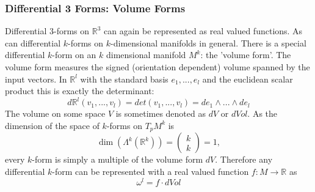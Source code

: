 \subsubsection*{Differential 3 Forms: Volume Forms}
Differential $3$-forms on $\mathbb R^3$ can again be represented as real valued functions. As can differential $k$-forms on $k$-dimensional manifolds in general.
There is a special differential $k$-form on an $k$ dimensional manifold $M^k$: the 'volume form'. The volume form measures the signed (orientation dependent) volume spanned by the input vectors. In $\mathbb R^l$ with the standard basis $e_1,...,e_l$ and the euclidean scalar product this is exactly the determinant:
\[d\mathbb R^l (v_1,..., v_l) = det(v_1,...,v_l) = de_1\wedge ...\wedge d e_l\]
The volume on some space $V$ is sometimes denoted as $dV$ or $dVol$.
 As the dimension of the space of $k$-forms on $T_pM^k$ is
\[\dim(\Lambda^k(\mathbb R^k)) = \begin{pmatrix}
	k\\k
\end{pmatrix}= 1,\]
every $k$-form is simply a multiple of the volume form $dV$. Therefore any differential $k$-form can be represented with a real valued function $f:M \rightarrow \mathbb R$ as
\[\omega^l = f \cdot dVol\]


